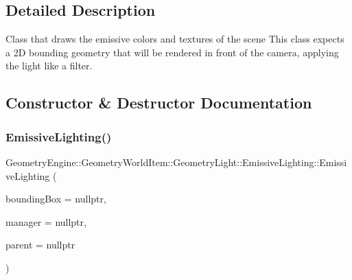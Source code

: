 \subsection{Detailed Description}
Class that draws the emissive colors and textures of the scene This class expects a 2D bounding geometry that will be rendered in front of the camera, applying the light like a filter. 

\subsection{Constructor \& Destructor Documentation}
\mbox{\label{class_geometry_engine_1_1_geometry_world_item_1_1_geometry_light_1_1_emissive_lighting_a224b3b3fd70066beab9f7229c7c45783}} 
\subsubsection{\texorpdfstring{EmissiveLighting()}{EmissiveLighting()}\hspace{0.1cm}{\footnotesize\ttfamily [1/2]}}
{\footnotesize\ttfamily Geometry\+Engine\+::\+Geometry\+World\+Item\+::\+Geometry\+Light\+::\+Emissive\+Lighting\+::\+Emissive\+Lighting (\begin{DoxyParamCaption}\item[{\mbox{\hyperlink{class_geometry_engine_1_1_geometry_world_item_1_1_geometry_item_1_1_geometry_item}{Geometry\+Item\+::\+Geometry\+Item}} $\ast$}]{bounding\+Box = {\ttfamily nullptr},  }\item[{const \mbox{\hyperlink{class_geometry_engine_1_1_light_utils_1_1_light_component_manager}{Light\+Utils\+::\+Light\+Component\+Manager}} $\ast$const}]{manager = {\ttfamily nullptr},  }\item[{\mbox{\hyperlink{class_geometry_engine_1_1_geometry_world_item_1_1_world_item}{World\+Item}} $\ast$}]{parent = {\ttfamily nullptr} }\end{DoxyParamCaption})}

